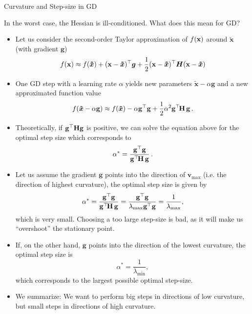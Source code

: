 
\begin{vbframe}{Curvature and Step-size in GD}
	
	In the worst case, the Hessian is ill-conditioned. What does this mean for GD?

	\begin{itemize}
		\item Let us consider the second-order Taylor approximation of $f(\mathbf{x})$ around $\bm{\tilde{x}}$ (with gradient $\mathbf{g}$)
		$$
		f(\mathbf{x}) \approx f(\bm{\tilde{x}}) + (\mathbf{x}-\bm{\tilde{x}})^\top \bm{g} +
		\frac 12(\mathbf{x}-\bm{\tilde{x}})^\top \bm{H}(\mathbf{x}-\bm{\tilde{x}})
		$$
		\item One GD step with a learning rate $\alpha$ yields new parameters $\bm{\tilde{x}}-\alpha \mathbf{g}$ and a new approximated function value
		$$
		f(\bm{\tilde{x}}-\alpha \mathbf{g}) \approx f(\bm{\tilde{x}}) - \alpha \mathbf{g}^\top\mathbf{g} + \frac{1}{2}	\alpha^2 \mathbf{g}^\top\!\mathbf{H}\,\mathbf{g}  \,.
		$$ 

		\item Theoretically, if $\mathbf{g}^\top \mathbf{H} \mathbf{g}$ is positive, we can solve the equation above for the optimal step size which corresponds to 
		$$
		\alpha^* = \frac{\mathbf{g}^\top \mathbf{g}}{\mathbf{g}^\top \!\mathbf{H}\, \mathbf{g}}  \,.
		$$

		\framebreak 
		
		\item Let us assume the gradient $\mathbf{g}$ points into the direction of $\bm{v}_{\text{max}}$ (i.e. the direction of highest curvature), the optimal step size is given by 
		$$
		\alpha^* = \frac{\mathbf{g}^\top \mathbf{g}}{\mathbf{g}^\top \!\mathbf{H}\, \mathbf{g}} = \frac{\mathbf{g}^\top \mathbf{g}}{\lambda_{\text{max}} \mathbf{g}^\top   \mathbf{g}} = \frac{1}{\lambda_{\text{max}}}, 
		$$ 
		which is very small. Choosing a too large step-size is bad, as it will make us \enquote{overshoot} the stationary point.
		\item If, on the other hand, $\mathbf{g}$ points into the direction of the lowest curvature, the optimal step size is 
		$$
		\alpha^* = \frac{1}{\lambda_{\text{min}}}, 
		$$
		which corresponds to the largest possible optimal step-size.
		\item We summarize: We want to perform big steps in directions of low curvature, but small steps in directions of high curvature.

		
		\framebreak 
		

\end{itemize}
\end{vbframe}
